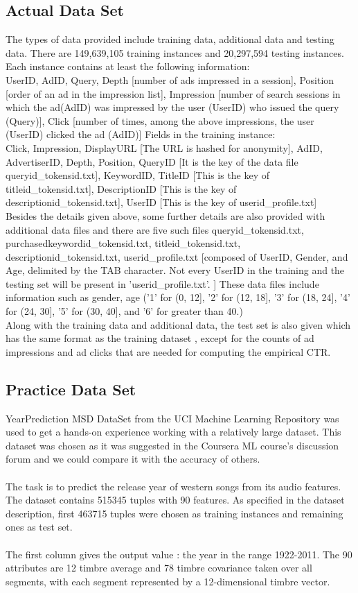 \documentclass[10pt]{article}
\begin{document}
\subsection{Actual Data Set}
The types of data provided include training data, additional data and testing data. There are 149,639,105 training instances and 20,297,594 testing instances.\\
Each instance contains at least the following information:\\
UserID, AdID, Query, Depth [number of ads impressed in a session], Position [order of an ad in the impression list], Impression [number of search sessions in which the ad(AdID) was impressed by the user (UserID) who issued the query (Query)], Click [number of times, among the above impressions, the user (UserID) clicked the ad (AdID)]
Fields in the training instance:\\
Click, Impression, DisplayURL [The URL is hashed for anonymity], AdID, AdvertiserID, Depth, Position, QueryID [It is the key of the data file queryid\_tokensid.txt], KeywordID, TitleID [This is the key of titleid\_tokensid.txt], DescriptionID [This is the key of descriptionid\_tokensid.txt], UserID [This is the key of userid\_profile.txt]\\
Besides the details given above, some further details are also provided with additional data files and there are five such files queryid\_tokensid.txt, purchasedkeywordid\_tokensid.txt, titleid\_tokensid.txt, descriptionid\_tokensid.txt, userid\_profile.txt [composed of UserID, Gender, and Age, delimited by the TAB character. Not every UserID in the training and the testing set will be present in 'userid\_profile.txt'. ]
These data files include information such as gender, age ('1'  for (0, 12],  '2' for (12, 18], '3' for (18, 24], '4'  for  (24, 30], '5' for (30,  40], and '6' for greater than 40.)\\
Along with the training data and additional data, the test set is also given which has the same format as the training dataset , except for the counts of ad impressions and ad clicks that are needed for computing the empirical CTR.
\\
\subsection{Practice Data Set}
YearPrediction MSD DataSet from the UCI Machine Learning Repository was used to get a hands-on experience working with a relatively large dataset. This dataset was chosen as it was suggested in the Coursera ML course's discussion forum and we could compare it with the accuracy of others.\\\\
The task is to predict the release year of western songs from its audio features. The dataset contains 515345 tuples with 90 features. As specified in the dataset description, first 463715 tuples were chosen as training instances and remaining ones as test set.
\\\\The first column gives the output value : the year in the range 1922-2011. The 90 attributes are 12 timbre average and 78 timbre covariance taken over all segments, with each segment represented by a 12-dimensional timbre vector.  
\end{document}
